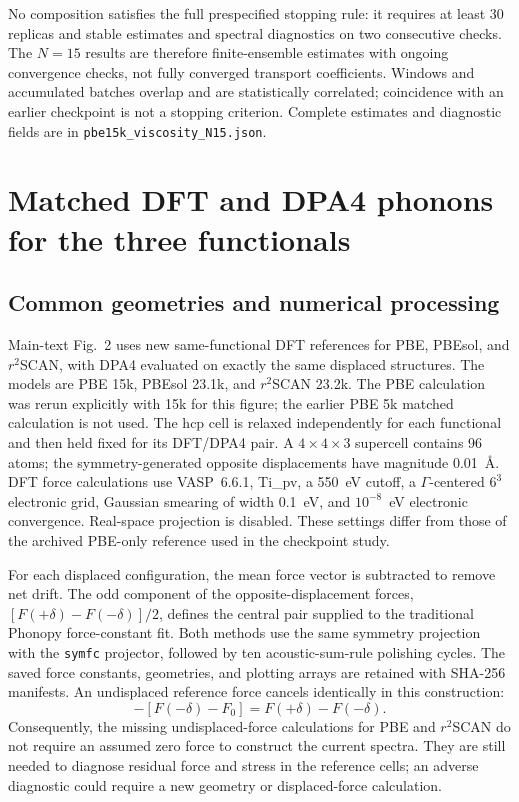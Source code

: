 \documentclass[10pt]{article}
\newcommand{\rscan}{\ensuremath{r^{2}}SCAN}
\begin{document}
No composition satisfies the full prespecified stopping rule: it requires at least 30 replicas and stable estimates and spectral diagnostics on two consecutive checks. The $N=15$ results are therefore finite-ensemble estimates with ongoing convergence checks, not fully converged transport coefficients. Windows and accumulated batches overlap and are statistically correlated; coincidence with an earlier checkpoint is not a stopping criterion. Complete estimates and diagnostic fields are in \texttt{pbe15k\_viscosity\_N15.json}.

\section{Matched DFT and DPA4 phonons for the three functionals}
\label{sec:matched_phonons}

\subsection{Common geometries and numerical processing}
Main-text Fig.~2 uses new same-functional DFT references for PBE, PBEsol, and \rscan{}, with DPA4 evaluated on exactly the same displaced structures.
The models are PBE 15k, PBEsol 23.1k, and \rscan{} 23.2k. The PBE calculation was rerun explicitly with 15k for this figure; the earlier PBE 5k matched calculation is not used.
The hcp cell is relaxed independently for each functional and then held fixed for its DFT/DPA4 pair. A $4\times4\times3$ supercell contains 96 atoms; the symmetry-generated opposite displacements have magnitude 0.01~\AA.
DFT force calculations use VASP~6.6.1, Ti\_pv, a 550~eV cutoff, a $\Gamma$-centered $6^3$ electronic grid, Gaussian smearing of width 0.1~eV, and $10^{-8}$~eV electronic convergence. Real-space projection is disabled.
These settings differ from those of the archived PBE-only reference used in the checkpoint study.

For each displaced configuration, the mean force vector is subtracted to remove net drift.
The odd component of the opposite-displacement forces, $[F(+\delta)-F(-\delta)]/2$, defines the central pair supplied to the traditional Phonopy force-constant fit.
Both methods use the same symmetry projection with the \texttt{symfc} projector, followed by ten acoustic-sum-rule polishing cycles.
The saved force constants, geometries, and plotting arrays are retained with SHA-256 manifests.
An undisplaced reference force cancels identically in this construction:
\begin{equation}
 [F(+\delta)-F_0]-[F(-\delta)-F_0]
 = F(+\delta)-F(-\delta).
\end{equation}
Consequently, the missing undisplaced-force calculations for PBE and \rscan{} do not require an assumed zero force to construct the current spectra.
They are still needed to diagnose residual force and stress in the reference cells; an adverse diagnostic could require a new geometry or displaced-force calculation.
\end{document}
